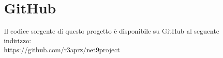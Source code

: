 \section{GitHub}
Il codice sorgente di questo progetto è disponibile su GitHub al seguente indirizzo: \\
\url{https://github.com/r3aprz/net9project}
